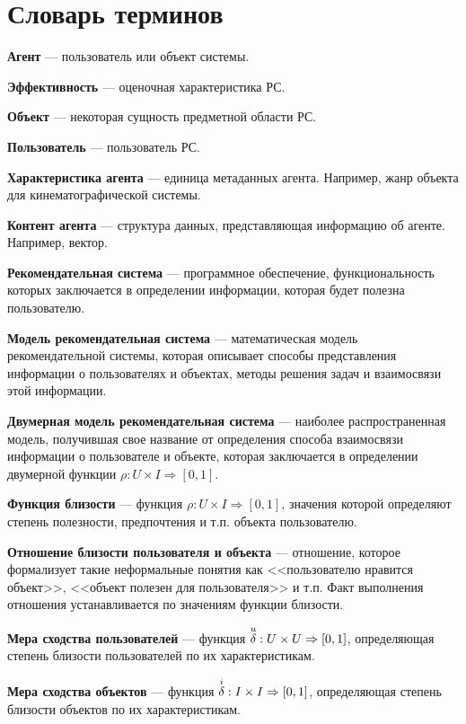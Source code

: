 \chapter*{Словарь терминов}             %

\textbf{Агент} --- пользователь или объект системы.

\textbf{Эффективность} --- оценочная характеристика РС.

\textbf{Объект} --- некоторая сущность предметной области РС.

\textbf{Пользователь} --- пользователь РС.

\textbf{Характеристика агента} --- единица метаданных агента. Например, жанр
объекта для кинематографической системы.

\textbf{Контент агента} --- структура данных, представляющая информацию об
агенте. Например, вектор.

\textbf{Рекомендательная система} --- программное обеспечение,
функциональность которых заключается в определении информации, которая
будет полезна пользователю.

\textbf{Модель рекомендательная система} --- математическая модель
рекомендательной системы, которая описывает способы представления информации
о пользователях и объектах, методы решения задач и взаимосвязи этой информации.

\textbf{Двумерная модель рекомендательная система} ---
наиболее распространенная модель, получившая свое название от определения
способа взаимосвязи информации о пользователе и объекте, которая
заключается в определении двумерной функции $\rho: U \times I \Rightarrow [0,1]$.

\textbf{Функция близости} --- функция $\rho: U \times I \Rightarrow [0,1]$,
значения которой определяют степень полезности, предпочтения и т.п. объекта
пользователю.

\textbf{Отношение близости пользователя и объекта} --- отношение, которое
формализует такие неформальные понятия как <<пользователю нравится объект>>,
<<объект полезен для пользователя>> и т.п. Факт выполнения отношения
устанавливается по значениям функции близости.

\textbf{Мера сходства пользователей} --- функция ${\overset{u}{\mathcal{\delta}}}: U \times U \Rightarrow
[0,1]$, определяющая степень близости пользователей по их характеристикам.

\textbf{Мера сходства объектов} --- функция ${\overset{i}{\mathcal{\delta}}}: I \times I \Rightarrow
[0,1]$, определяющая степень близости объектов по их характеристикам.

